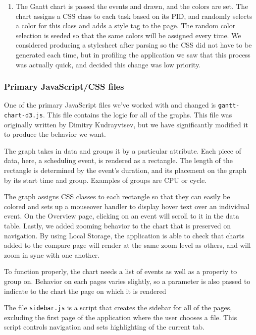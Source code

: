 \documentclass{hmcclinic}
\begin{document}
\begin{enumerate}
   \item The Gantt chart is passed the events and drawn, and the colors are set.
     The chart assigns a CSS class to each task based on its PID, and randomly
     selects a color for this class and adds a style tag to the page. The random
     color selection is seeded so that the same colors will be assigned every
     time. We considered producing a stylesheet after parsing so the CSS did not have
     to be generated each time, but in profiling the application we saw that
     this process was actually quick, and decided this change was low
     priority.

  \end{enumerate}
  \subsubsection{Primary JavaScript/CSS files}
  One of the primary JavaScript files we've worked
  with and changed is \texttt{gantt-chart-d3.js}. This file contains the logic for all of the
  graphs. This file was originally written by Dimitry Kudrayvtsev, %
 but we have significantly modified it to produce the behavior we want.

  The graph takes in data and groups it by a particular attribute. Each piece
  of data, here, a scheduling event, is rendered as a rectangle. The
  length of the rectangle is determined by the event's duration, and its
  placement on the graph by its start time and group. Examples of groups are
  CPU or cycle.

  The graph assigns CSS classes to each rectangle so that they can easily be
  colored and sets up a mouseover handler to display hover text
  over an individual event. On the Overview page, clicking
  on an event will scroll to it in the data table.
  Lastly, we added zooming behavior to the chart that is
  preserved on navigation. By using Local Storage, the application is
  able to check that charts added to the compare page will render at the
  same zoom level as others, and will zoom in sync with one another.

  To function properly, the chart needs a list of events
  as well as a property to group on. Behavior on each pages varies
  slightly, so a parameter is also passed to indicate to the chart the page on
  which it is rendered

  The file \texttt{sidebar.js} is a script that creates the sidebar for all of the
  pages, excluding the first page of the application where the user chooses a file.
  This script controls navigation and sets highlighting of the current tab.
\end{document}
